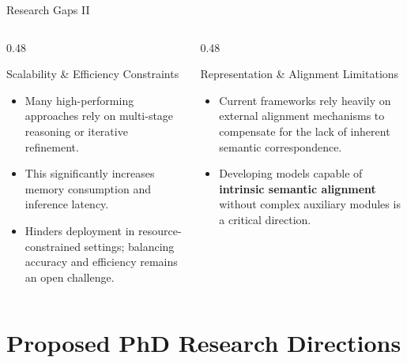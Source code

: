 \documentclass[aspectratio=169, 10pt]{beamer}
\begin{document}
\begin{frame}{Research Gaps II}
    \begin{columns}[T]
        \begin{column}{0.48\textwidth}
            \begin{alertblock}{Scalability \& Efficiency Constraints}
                \footnotesize
                \begin{itemize}
                    \item Many high-performing approaches rely on multi-stage reasoning or iterative refinement.
                    \item This significantly increases memory consumption and inference latency.
                    \item Hinders deployment in resource-constrained settings; balancing accuracy and efficiency remains an open challenge.
                \end{itemize}
            \end{alertblock}
        \end{column}
        
        \begin{column}{0.48\textwidth}
            \begin{alertblock}{Representation \& Alignment Limitations}
                \footnotesize
                \begin{itemize}
                    \item Current frameworks rely heavily on external alignment mechanisms to compensate for the lack of inherent semantic correspondence.
                    \item Developing models capable of \textbf{intrinsic semantic alignment} without complex auxiliary modules is a critical direction.
                \end{itemize}
            \end{alertblock}
        \end{column}
    \end{columns}
\end{frame}

\section{Proposed PhD Research Directions}
\end{document}
